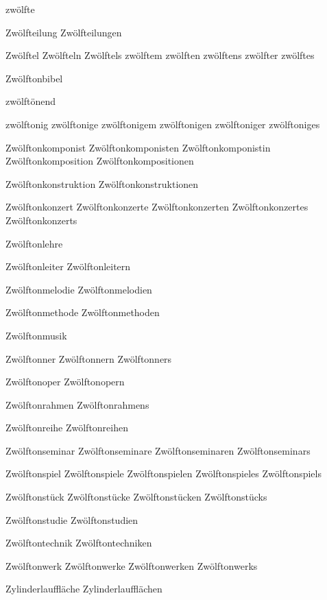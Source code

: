 zwölfte

Zwölfteilung
Zwölfteilungen

Zwölftel
Zwölfteln
Zwölftels
zwölftem
zwölften
zwölftens
zwölfter
zwölftes

Zwölftonbibel

zwölftönend

zwölftonig
zwölftonige
zwölftonigem
zwölftonigen
zwölftoniger
zwölftoniges

Zwölftonkomponist
Zwölftonkomponisten
Zwölftonkomponistin
Zwölftonkomposition
Zwölftonkompositionen

Zwölftonkonstruktion
Zwölftonkonstruktionen

Zwölftonkonzert
Zwölftonkonzerte
Zwölftonkonzerten
Zwölftonkonzertes
Zwölftonkonzerts

Zwölftonlehre

Zwölftonleiter
Zwölftonleitern

Zwölftonmelodie
Zwölftonmelodien

Zwölftonmethode
Zwölftonmethoden

Zwölftonmusik

Zwölftonner
Zwölftonnern
Zwölftonners

Zwölftonoper
Zwölftonopern

Zwölftonrahmen
Zwölftonrahmens

Zwölftonreihe
Zwölftonreihen

Zwölftonseminar
Zwölftonseminare
Zwölftonseminaren
Zwölftonseminars

Zwölftonspiel
Zwölftonspiele
Zwölftonspielen
Zwölftonspieles
Zwölftonspiels

Zwölftonstück
Zwölftonstücke
Zwölftonstücken
Zwölftonstücks

Zwölftonstudie
Zwölftonstudien

Zwölftontechnik
Zwölftontechniken

Zwölftonwerk
Zwölftonwerke
Zwölftonwerken
Zwölftonwerks

Zylinderlauffläche
Zylinderlaufflächen
